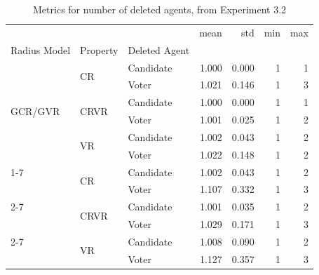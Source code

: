 \begin{table}[b!]
\centering
    \begin{tabular}{lllrrrr}
        \toprule
                &    &       &  mean &   std &   min &   max \\
        Radius Model & Property & Deleted Agent &       &       &       &       \\
        \midrule
        \multirow{6}{*}{GCR/GVR} & \multirow{2}{*}{CR} & Candidate & 1.000 & 0.000 & 1 & 1 \\
                &    & Voter & 1.021 & 0.146 & 1 & 3 \\
        \cline{2-7}
                & \multirow{2}{*}{CRVR} & Candidate & 1.000 & 0.000 & 1 & 1 \\
                &    & Voter & 1.001 & 0.025 & 1 & 2 \\
        \cline{2-7}
                & \multirow{2}{*}{VR} & Candidate & 1.002 & 0.043 & 1 & 2 \\
                &    & Voter & 1.022 & 0.148 & 1 & 2 \\
        \cline{1-7}
        \cline{2-7}
        \multirow{6}{*}{LUCR/LUVR} & \multirow{2}{*}{CR} & Candidate & 1.002 & 0.043 & 1 & 2 \\
                &    & Voter & 1.107 & 0.332 & 1 & 3 \\
        \cline{2-7}
                & \multirow{2}{*}{CRVR} & Candidate & 1.001 & 0.035 & 1 & 2 \\
                &    & Voter & 1.029 & 0.171 & 1 & 3 \\
        \cline{2-7}
                & \multirow{2}{*}{VR} & Candidate & 1.008 & 0.090 & 1 & 2 \\
                &    & Voter & 1.127 & 0.357 & 1 & 3 \\
        \bottomrule
    \end{tabular}
    \caption{Metrics for number of deleted agents, from Experiment 3.2}
    \label{tab:ex32}
\end{table}
